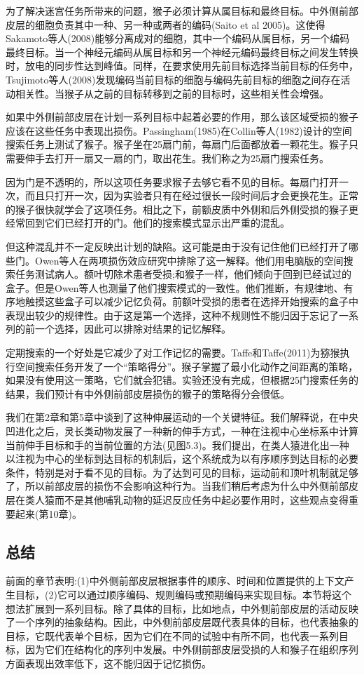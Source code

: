 为了解决迷宫任务所带来的问题，猴子必须计算从属目标和最终目标。中外侧前部皮层的细胞负责其中一种、另一种或两者的编码(Saito et al 2005)。这使得Sakamoto等人(2008)能够分离成对的细胞，其中一个编码从属目标，另一个编码最终目标。当一个神经元编码从属目标和另一个神经元编码最终目标之间发生转换时，放电的同步性达到峰值。同样，在要求使用先前目标选择当前目标的任务中，Tsujimoto等人(2008)发现编码当前目标的细胞与编码先前目标的细胞之间存在活动相关性。当猴子从之前的目标转移到之前的目标时，这些相关性会增强。

如果中外侧前部皮层在计划一系列目标中起着必要的作用，那么该区域受损的猴子应该在这些任务中表现出损伤。Passingham(1985)在Collin等人(1982)设计的空间搜索任务上测试了猴子。猴子坐在25扇门前，每扇门后面都放着一颗花生。猴子只需要伸手去打开一扇又一扇的门，取出花生。我们称之为25扇门搜索任务。

因为门是不透明的，所以这项任务要求猴子去够它看不见的目标。每扇门打开一次，而且只打开一次，因为实验者只有在经过很长一段时间后才会更换花生。正常的猴子很快就学会了这项任务。相比之下，前额皮质中外侧和后外侧受损的猴子更经常回到它们已经打开的门。他们的搜索模式显示出严重的混乱。

但这种混乱并不一定反映出计划的缺陷。这可能是由于没有记住他们已经打开了哪些门。Owen等人在两项损伤效应研究中排除了这一解释。他们用电脑版的空间搜索任务测试病人。额叶切除术患者受损;和猴子一样，他们倾向于回到已经试过的盒子。但是Owen等人也测量了他们搜索模式的一致性。他们推断，有规律地、有序地触摸这些盒子可以减少记忆负荷。前额叶受损的患者在选择开始搜索的盒子中表现出较少的规律性。由于这是第一个选择，这种不规则性不能归因于忘记了一系列的前一个选择，因此可以排除对结果的记忆解释。

定期搜索的一个好处是它减少了对工作记忆的需要。Taffe和Taffe(2011)为猕猴执行空间搜索任务开发了一个“策略得分”。猴子掌握了最小化动作之间距离的策略，如果没有使用这一策略，它们就会犯错。实验还没有完成，但根据25门搜索任务的结果，我们预计有中外侧前部皮层损伤的猴子的策略得分会很低。

我们在第2章和第5章中谈到了这种伸展运动的一个关键特征。我们解释说，在中央凹进化之后，灵长类动物发展了一种新的伸手方式，一种在注视中心坐标系中计算当前伸手目标和手的当前位置的方法(见图5.3)。我们提出，在类人猿进化出一种以注视为中心的坐标到达目标的机制后，这个系统成为以有序顺序到达目标的必要条件，特别是对于看不见的目标。为了达到可见的目标，运动前和顶叶机制就足够了，所以前部皮层的损伤不会影响这种行为。当我们稍后考虑为什么中外侧前部皮层在类人猿而不是其他哺乳动物的延迟反应任务中起必要作用时，这些观点变得重要起来(第10章)。

\subsection{总结}
前面的章节表明:(1)中外侧前部皮层根据事件的顺序、时间和位置提供的上下文产生目标，(2)它可以通过顺序编码、规则编码或预期编码来实现目标。本节将这个想法扩展到一系列目标。除了具体的目标，比如地点，中外侧前部皮层的活动反映了一个序列的抽象结构。因此，中外侧前部皮层既代表具体的目标，也代表抽象的目标，它既代表单个目标，因为它们在不同的试验中有所不同，也代表一系列目标，因为它们在结构化的序列中发展。中外侧前部皮层受损的人和猴子在组织序列方面表现出效率低下，这不能归因于记忆损伤。

